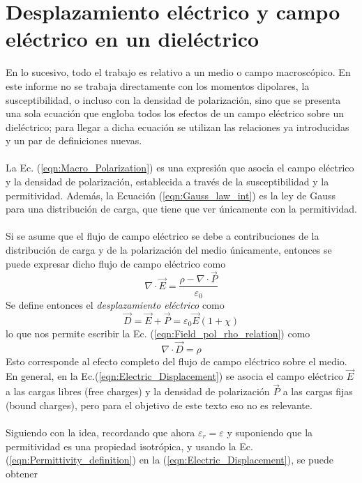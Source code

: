 \documentclass[12pt, oneside, numbers, spanish]{ezthesis}
\numberwithin{equation}{section}
\begin{document}
\section{Desplazamiento eléctrico y campo eléctrico en un dieléctrico}\label{Sec:Elec_Displacement}
En lo sucesivo, todo el trabajo es relativo a un medio o campo macroscópico. En este informe no se trabaja directamente con los momentos dipolares, la susceptibilidad, o incluso con la densidad de polarización, sino que se presenta una sola ecuación que engloba todos los efectos de un campo eléctrico sobre un dieléctrico; para llegar a dicha ecuación se utilizan las relaciones ya introducidas y un par de definiciones nuevas.\\\\
La Ec. (\ref{eqn:Macro_Polarization}) es una expresión que asocia el campo eléctrico y la densidad de polarización, establecida a través de la susceptibilidad y la permitividad. Además, la Ecuación (\ref{eqn:Gauss_law_int}) es la ley de Gauss para una distribución de carga, que tiene que ver únicamente con la permitividad.\\\\
Si se asume que el flujo de campo eléctrico se debe a contribuciones de la distribución de carga y de la polarización del medio únicamente, entonces se puede expresar dicho flujo de campo eléctrico como
\begin{equation}\label{eqn:Field_pol_rho_relation}
\nabla\cdot\vec{E} = \frac{\rho - \nabla\cdot\vec{P}}{\varepsilon_0}
\end{equation}
Se define entonces el \textit{desplazamiento eléctrico} como
\begin{equation}\label{eqn:Electric_Displacement}
\vec{D} = \vec{E} + \vec{P} = \varepsilon_0\vec{E}(1 + \chi)
\end{equation}
lo que nos permite escribir la Ec. (\ref{eqn:Field_pol_rho_relation}) como
\begin{equation}
\nabla\cdot\vec{D} = \rho
\end{equation}
Esto corresponde al efecto completo del flujo de campo eléctrico sobre el medio. En general, en la Ec.(\ref{eqn:Electric_Displacement}) se asocia el campo eléctrico $\vec{E}$ a las cargas libres (free charges) y la densidad de polarización $\vec{P}$ a las cargas fijas (bound charges), pero para el objetivo de este texto eso no es relevante.\\\\
Siguiendo con la idea, recordando que ahora $\varepsilon_r = \varepsilon$ y suponiendo que la permitividad es una propiedad isotrópica, y usando la Ec. (\ref{eqn:Permittivity_definition}) en la (\ref{eqn:Electric_Displacement}), se puede obtener
\end{document}
